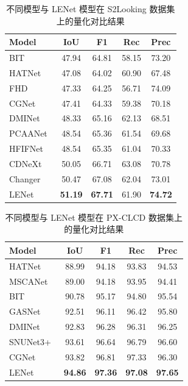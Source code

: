 \begin{table}[!htbp]
  \centering
  \caption{不同模型与 LENet 模型在 S2Looking 数据集上的量化对比结果}
  \label{tab:lenet_s2looking}
  \begin{tabular}{lcccc}
    \toprule
    Model              &  IoU   &   F1   &   Rec   &  Prec  \\
    \midrule
    BIT~\cite{chen_remote_2022}       & 47.94  & 64.81  & 58.15   & 73.20  \\
    HATNet~\cite{Xu2024HybridAT}    & 47.08  & 64.02  & 60.90   & 67.48  \\
    FHD~\cite{pei_feature_2022}       & 47.33  & 64.25  & 56.71   & 74.09  \\
    CGNet~\cite{han_change_2023}     & 47.41  & 64.33  & 59.38   & 70.18  \\
    DMINet~\cite{feng_change_2023}    & 48.33  & 65.16  & 62.13   & 68.51  \\
    PCAANet~\cite{Xu2023ProgressiveCA}   & 48.54  & 65.36  & 61.54   & 69.68  \\
    HFIFNet~\cite{Han2025HFIFNetHF}   & 48.54  & 65.35  & 61.04   & 70.33  \\
    CDNeXt~\cite{wei_robust_2024}    & 50.05  & 66.71  & 63.08   & 70.78  \\
    Changer~\cite{Fang2022ChangerFI}   & 50.47  & 67.08  & 62.04   & 73.01  \\
    LENet              & \textbf{51.19} & \textbf{67.71} & 61.90 & \textbf{74.72} \\
    \bottomrule
  \end{tabular}
\end{table}


\begin{table}[!htbp]
  \centering
  \caption{不同模型与 LENet 模型在 PX-CLCD 数据集上的量化对比结果}
  \label{tab:lenet_pxclcd}
  \begin{tabular}{lcccc}
    \toprule
    Model              &  IoU   &   F1   &   Rec   &  Prec  \\
    \midrule
    HATNet~\cite{Xu2024HybridAT}    & 88.99  & 94.18  & 93.83   & 94.53  \\
    MSCANet~\cite{m_liu_cnn-transformer_2022}   & 89.00  & 94.18  & 93.95   & 94.41  \\
    BIT~\cite{chen_remote_2022}      & 90.78  & 95.17  & 94.80   & 95.54  \\
    GASNet~\cite{zhang_global-aware_2023}    & 92.51  & 96.11  & 96.42   & 95.80  \\
    DMINet~\cite{feng_change_2023}    & 92.83  & 96.28  & 96.31   & 96.25  \\
    SNUNet3+~\cite{miao_snunet3_2024}  & 93.61  & 96.64  & 96.79   & 96.60  \\
    CGNet~\cite{han_change_2023}     & 93.82  & 96.81  & 97.33   & 96.30  \\
    LENet               & \textbf{94.86} & \textbf{97.36} & \textbf{97.08} & \textbf{97.65} \\
    \bottomrule
  \end{tabular}
\end{table}


